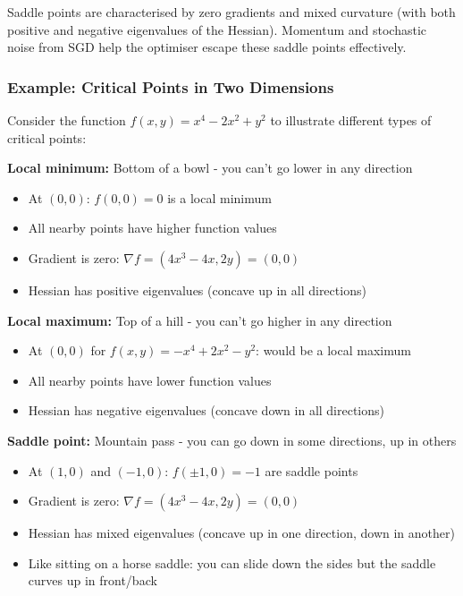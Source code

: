 Saddle points are characterised by zero gradients and mixed curvature (with both positive and negative eigenvalues of the Hessian). Momentum and stochastic noise from SGD help the optimiser escape these saddle points effectively.

\subsubsection{Example: Critical Points in Two Dimensions}

Consider the function $f(x,y) = x^4 - 2x^2 + y^2$ to illustrate different types of critical points:

\textbf{Local minimum:} Bottom of a bowl - you can't go lower in any direction
\begin{itemize}
    \item At $(0,0)$: $f(0,0) = 0$ is a local minimum
    \item All nearby points have higher function values
    \item Gradient is zero: $\nabla f = (4x^3 - 4x, 2y) = (0,0)$
    \item Hessian has positive eigenvalues (concave up in all directions)
\end{itemize}

\textbf{Local maximum:} Top of a hill - you can't go higher in any direction
\begin{itemize}
    \item At $(0,0)$ for $f(x,y) = -x^4 + 2x^2 - y^2$: would be a local maximum
    \item All nearby points have lower function values
    \item Hessian has negative eigenvalues (concave down in all directions)
\end{itemize}

\textbf{Saddle point:} Mountain pass - you can go down in some directions, up in others
\begin{itemize}
    \item At $(1,0)$ and $(-1,0)$: $f(\pm 1,0) = -1$ are saddle points
    \item Gradient is zero: $\nabla f = (4x^3 - 4x, 2y) = (0,0)$
    \item Hessian has mixed eigenvalues (concave up in one direction, down in another)
    \item Like sitting on a horse saddle: you can slide down the sides but the saddle curves up in front/back
\end{itemize}

